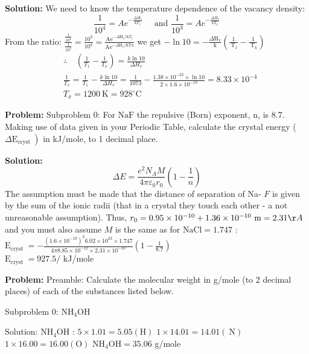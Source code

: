 \documentclass[10pt]{article}
\begin{document}
\textbf{Solution:}
We need to know the temperature dependence of the vacancy density:
\[
\frac{1}{10^{4}}=A e^{-\frac{\Delta H_{v}}{k T_{1}}} \quad \text { and } \frac{1}{10^{3}}=A e^{-\frac{\Delta H_{v}}{k T_{x}}}
\]
From the ratio: $\frac{\frac{1}{10^{4}}}{\frac{1}{10^{3}}}=\frac{10^{3}}{10^{4}}=\frac{\mathrm{Ae}^{-\Delta \mathrm{H}_{v} / \mathrm{k} T_{1}}}{\mathrm{Ae}^{-\Delta \mathrm{H}_{v} / \mathrm{kT} \mathrm{x}}}$ we get $-\ln 10=-\frac{\Delta \mathrm{H}_{\mathrm{v}}}{\mathrm{k}}\left(\frac{1}{\mathrm{~T}_{1}}-\frac{1}{\mathrm{~T}_{\mathrm{x}}}\right)$
\[
\begin{aligned}
&\therefore \quad\left(\frac{1}{T_{1}}-\frac{1}{T_{x}}\right)=\frac{k \ln 10}{\Delta H_{v}} \\
&\frac{1}{T_{x}}=\frac{1}{T_{1}}-\frac{k \ln 10}{\Delta H_{v}}=\frac{1}{1073}-\frac{1.38 \times 10^{-23} \times \ln 10}{2 \times 1.6 \times 10^{-19}}=8.33 \times 10^{-4} \\
&T_{x}=1200 \mathrm{~K}= \boxed{928}^{\circ} \mathrm{C}
\end{aligned}
\]


\textbf{Problem:}
Subproblem 0: For $\mathrm{NaF}$ the repulsive (Born) exponent, $\mathrm{n}$, is 8.7. Making use of data given in your Periodic Table, calculate the crystal energy ( $\left.\Delta \mathrm{E}_{\text {cryst }}\right)$ in kJ/mole, to 1 decimal place.


\textbf{Solution:}
\[
\Delta E=\frac{e^{2} N_{A} M}{4 \pi \varepsilon_{0} r_{0}}\left(1-\frac{1}{n}\right)
\]
The assumption must be made that the distance of separation of Na- $F$ is given by the sum of the ionic radii (that in a crystal they touch each other - a not unreasonable assumption). Thus, $r_{0}=0.95 \times 10^{-10}+1.36 \times 10^{-10} \mathrm{~m}=2.31 \AA$ and you must also assume $M$ is the same as for $\mathrm{NaCl}=1.747$ : $\mathrm{E}_{\text {cryst }}=-\frac{\left(1.6 \times 10^{-19}\right)^{2} 6.02 \times 10^{23} \times 1.747}{4 \pi 8.85 \times 10^{-12} \times 2.31 \times 10^{-10}}\left(1-\frac{1}{8.7}\right)$
\\
$\mathrm{E}_{\text {cryst }}=\boxed{927.5} /$ kJ/mole 


\textbf{Problem:}
Preamble: Calculate the molecular weight in g/mole (to 2 decimal places) of each of the substances listed below.

Subproblem 0: $\mathrm{NH}_{4} \mathrm{OH}$


Solution: $\mathrm{NH}_{4} \mathrm{OH}$ :
$5 \times 1.01=5.05(\mathrm{H})$
$1 \times 14.01=14.01(\mathrm{~N})$
$1 \times 16.00=16.00(\mathrm{O})$
$\mathrm{NH}_{4} \mathrm{OH}= \boxed{35.06}$ g/mole
\end{document}
